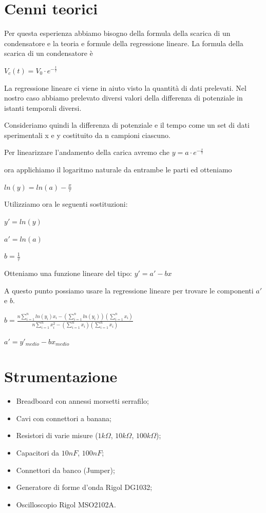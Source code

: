     \section{Cenni teorici}
    Per questa esperienza abbiamo bisogno della formula della scarica di un condensatore e la teoria e formule della regressione lineare.
    La formula della scarica di un condensatore è \par
    $V_c(t)=V_0 \cdot e^{-\frac{t}{\tau}}$ \par
    La regressione lineare ci viene in aiuto visto la quantità di dati prelevati.
     Nel nostro caso abbiamo prelevato diversi valori della differenza di potenziale in istanti temporali diversi.\par
    Consideriamo quindi la differenza di potenziale e il tempo come un set di dati sperimentali x e y costituito da n campioni ciascuno.\par 
    Per linearizzare l’andamento della carica avremo che $y=a \cdot e^{-\frac{x}{\tau}}$ \par
    ora applichiamo il logaritmo naturale da entrambe le parti ed otteniamo \par
    $ln(y)=ln(a)-{\frac{x}{\tau}}$ \par
    Utilizziamo ora le seguenti sostituzioni: \par
    $y'=ln(y)$ \par
    $a'=ln(a)$ \par
    $b=\frac{1}{\tau}$ \par
    Otteniamo una funzione lineare del tipo: $y'=a'-bx$ \par
    A questo punto possiamo usare la regressione lineare per trovare le componenti $a'$ e $b$. \par
    $b=\frac{n\sum_{i = 1}^{n} ln(y_i)x_i - (\sum_{i = 1}^{n} ln(y_i))(\sum_{i = 1}^{n} x_i) }{n\sum_{i = 1}^{n} x_i^2 - (\sum_{i = 1}^{n} x_i)(\sum_{i = 1}^{n} x_i)}$ \par
    $a'=y'_{medio}-bx_{medio}$ \par


    \section{Strumentazione}
    \begin{itemize}
        \item Breadboard con annessi morsetti serrafilo;
        \item Cavi con connettori a banana;
        \item Resistori di varie misure ($1k\Omega$, $10k\Omega$, $100k\Omega$);
        \item Capacitori da $10nF$, $100nF$;
        \item Connettori da banco (Jumper);
        \item Generatore di forme d'onda Rigol DG1032;
        \item Oscilloscopio Rigol MSO2102A.
    \end{itemize}

